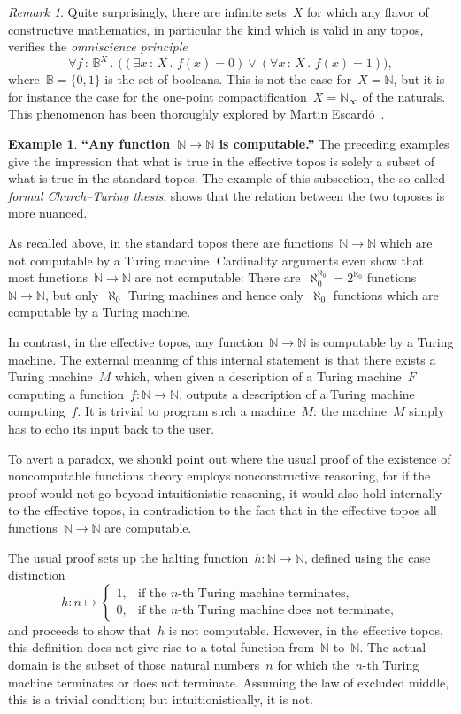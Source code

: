 \documentclass[oneside,reqno]{amsart}
\theoremstyle{definition}
\newtheorem{ex}[defn]{Example}
\theoremstyle{plain}
\theoremstyle{remark}
\newtheorem{rem}[defn]{Remark}
\newcommand{\BB}{\mathbb{B}}
\newcommand{\NN}{\mathbb{N}}
\renewcommand{\_}{\mathpunct{.}\,}
\newcommand{\effective}{ef{}fective\xspace}
\newcommand{\?}{\,{:}\,}
\begin{document}
\begin{rem}Quite surprisingly, there are infinite sets~$X$ for which any flavor of constructive
mathematics, in particular the kind which is valid in any topos, verifies the
\emph{omniscience principle}
\[ \forall f\?\BB^X\_ \bigl((\exists x\?X\_ f(x) = 0) \vee (\forall x\?X\_ f(x)
= 1)\bigr), \]
where~$\BB = \{ 0, 1 \}$ is the set of booleans. This is not the case for~$X =
\NN$, but it is for instance the case for the one-point compactification~$X =
\NN_\infty$ of the naturals. This phenomenon has been thoroughly explored by
Martin Escardó~\cite{escardo:omniscience}.\end{rem}

\begin{ex}\textbf{``Any function~$\NN \to \NN$ is computable.''}
The preceding examples give the impression that what is true in the
\effective topos is solely a subset of what is true in the standard topos. The
example of this subsection, the so-called \emph{formal Church--Turing thesis},
shows that the relation between the two toposes is more nuanced.

As recalled above, in the standard topos there are functions~$\NN \to \NN$ which are not computable by a Turing
machine. Cardinality arguments
even show that most functions~$\NN \to \NN$ are not computable: There
are~$\aleph_0^{\aleph_0} = 2^{\aleph_0}$ functions~$\NN \to \NN$, but
only~$\aleph_0$ Turing machines and hence only~$\aleph_0$ functions which are
computable by a Turing machine.

In contrast, in the \effective topos, any function~$\NN \to \NN$ is computable
by a Turing machine. The external meaning of this internal statement is that
there exists a Turing machine~$M$ which, when given a description of a Turing
machine~$F$ computing a function~$f : \NN \to \NN$, outputs a description of a
Turing machine computing~$f$. It is trivial to program such a machine~$M$: the
machine~$M$ simply has to echo its input back to the user.

To avert a paradox, we should point out where the usual proof of the
existence of noncomputable functions theory employs nonconstructive reasoning, for if
the proof would not go beyond intuitionistic reasoning, it would also hold internally to the
\effective topos, in contradiction to the fact that in the \effective topos
all functions~$\NN \to \NN$ are computable.

The usual proof sets up the halting function~$h : \NN \to \NN$, defined using
the case distinction
\[ h : n \mapsto \begin{cases}
  1, & \text{if the $n$-th Turing machine terminates}, \\
  0, & \text{if the $n$-th Turing machine does not terminate},
\end{cases} \]
and proceeds to show that~$h$ is not computable. However, in the \effective
topos, this definition does not give rise to a total function from~$\NN$
to~$\NN$. The actual domain is the subset of those natural numbers~$n$
for which the~$n$-th Turing machine
terminates or does not terminate. Assuming the law of excluded middle, this is
a trivial condition; but intuitionistically, it is not.
\end{ex}
\end{document}

